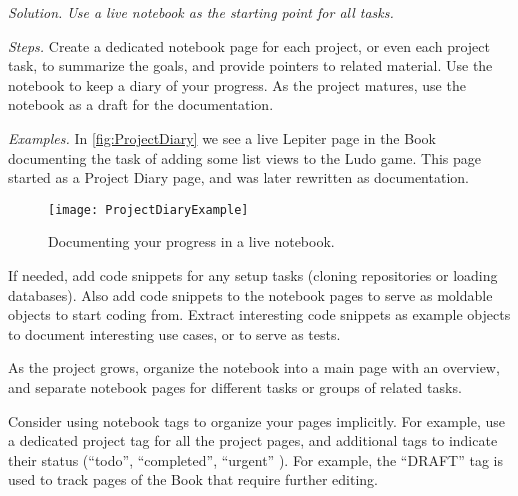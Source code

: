 \documentclass[acmsmall,screen,authorversion,nonacm]{acmart} %
\newcommand\eog[1]{\nbc{Edward}{#1}{purple}}
\newcommand\cp[1]{\nbe{Cesare}{#1}{olive}} %
\newcommand{\GT}{\lst{GT}\xspace} %
\newcommand{\patsec}[1]{\noindent\textit{#1.}\xspace}
\begin{document}
\patsec{Solution}
\emph{Use a live notebook 
as the starting point for all tasks.}

\patsec{Steps}
Create a dedicated notebook page for each project, or even each project task, to summarize the goals, and provide pointers to related material.
Use the notebook to keep a diary of your progress.
As the project matures, use the notebook as a draft 
for the documentation.

\patsec{Examples}
In \autoref{fig:ProjectDiary} we see a live Lepiter page in the \GT Book
documenting the task of adding some list views to the Ludo game.
This page started as a Project Diary page, and was later rewritten as documentation.


\begin{figure}[h]
  \texttt{[image: ProjectDiaryExample]}
  \caption{Documenting your progress in a live notebook.}
  \label{fig:ProjectDiary}
\end{figure}

If needed, add code snippets for any setup tasks (\eg cloning repositories or loading databases).
Also add code snippets to the notebook pages to serve as moldable objects to start coding from.
Extract interesting code snippets as example objects to document interesting use cases, or to serve as tests.

As the project grows, organize the notebook into a main page with an overview, and separate notebook pages for different tasks or groups of related tasks.

Consider using notebook tags 
to organize your pages implicitly. For example, use a dedicated project tag for all the project pages, and additional tags to indicate their status (``todo'', ``completed'', ``urgent'' \etc).
For example, the ``DRAFT'' tag is used to track pages of the \GT Book that require further editing.
\end{document}
